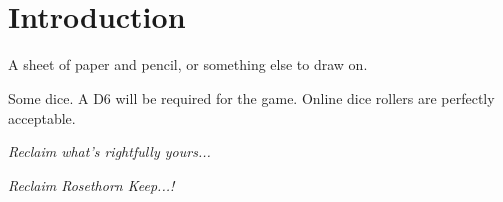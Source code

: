 \documentclass[english,10pt,openany,a5paper]{book}
\newcommand\blankpage{%
	\newpage 
	
	\thispagestyle{empty}%
	\
	
	\newpage }
\begin{document}
	
	
	
	\blankpage
	
	
	
	\newpage
	
	\setcounter{tocdepth}{0}
	\renewcommand{\cftchapleader}{\normalfont\cftdotfill{\cftdotsep}}
	
	\toc[3]
	
	\blankpage
	
	\chapter{Introduction}
	
	
	\tld  A sheet of paper and pencil, or something else to draw on.
	
	\tld  Some dice. A D6 will be required for the game. Online dice rollers are perfectly acceptable.
	
	\skipline
	\begin{adjustbox}{left}
		\em Reclaim what’s rightfully yours...\em
	\end{adjustbox}
	\begin{adjustbox}{right}
		\em Reclaim Rosethorn Keep...! \em
	\end{adjustbox}
	
	
	
	
	
\end{document}
